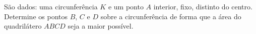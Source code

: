 São dados: uma circunferência $K$ e um ponto $A$ interior, fixo, distinto do centro.
Determine os pontos $B$, $C$ e $D$ sobre a circunferência de forma que a área do quadrilátero $ABCD$ seja a maior possível.